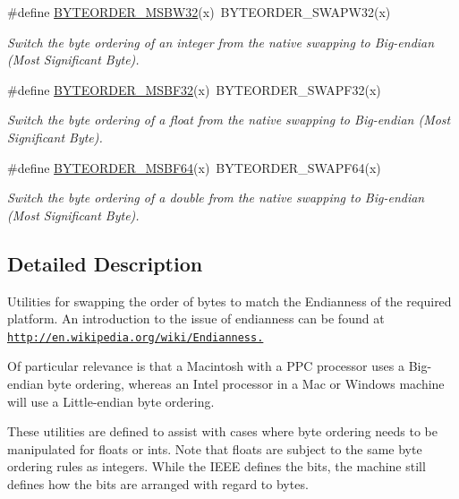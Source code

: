\begin{DoxyCompactItemize}
\#define \hyperlink{group__byteorder_ga46ff7133babdbfa8166fbdb4d40d72a7}{BYTEORDER\_\-MSBW32}(x)~BYTEORDER\_\-SWAPW32(x)
\begin{DoxyCompactList}\small\item\em Switch the byte ordering of an integer from the native swapping to Big-\/endian (Most Significant Byte). \item\end{DoxyCompactList}\item 
\#define \hyperlink{group__byteorder_gaa5783a6ed7c7d471150da5a9c5453f79}{BYTEORDER\_\-MSBF32}(x)~BYTEORDER\_\-SWAPF32(x)
\begin{DoxyCompactList}\small\item\em Switch the byte ordering of a float from the native swapping to Big-\/endian (Most Significant Byte). \item\end{DoxyCompactList}\item 
\#define \hyperlink{group__byteorder_ga5b3d8dac5e677fd03f1959a2ff68784e}{BYTEORDER\_\-MSBF64}(x)~BYTEORDER\_\-SWAPF64(x)
\begin{DoxyCompactList}\small\item\em Switch the byte ordering of a double from the native swapping to Big-\/endian (Most Significant Byte). \item\end{DoxyCompactList}\end{DoxyCompactItemize}


\subsection{Detailed Description}
Utilities for swapping the order of bytes to match the Endianness of the required platform. An introduction to the issue of endianness can be found at \href{http://en.wikipedia.org/wiki/Endianness.}{\tt http://en.wikipedia.org/wiki/Endianness.}

Of particular relevance is that a Macintosh with a PPC processor uses a Big-\/endian byte ordering, whereas an Intel processor in a Mac or Windows machine will use a Little-\/endian byte ordering.

These utilities are defined to assist with cases where byte ordering needs to be manipulated for floats or ints. Note that floats are subject to the same byte ordering rules as integers. While the IEEE defines the bits, the machine still defines how the bits are arranged with regard to bytes. 

